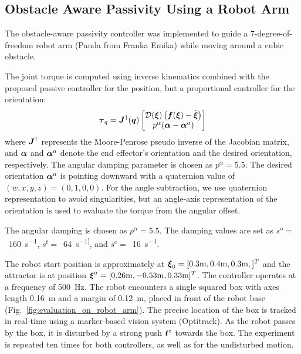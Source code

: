 \subsection{Obstacle Aware Passivity Using a Robot Arm}
The obstacle-aware passivity controller was implemented to guide a 7-degree-of-freedom robot arm (Panda from Franka Emika) while moving around a cubic obstacle. 

The joint torque is computed using inverse kinematics combined with the proposed passive controller for the position, but a proportional controller for the orientation:
\begin{equation}
	\boldsymbol{\tau}_q = \boldsymbol{J}^{\dag}(\boldsymbol{q}) 
	\begin{bmatrix} \mathcal{D}(\boldsymbol{\xi}) \left( \boldsymbol{f}(\boldsymbol{\xi}) - \dot{\boldsymbol{\xi}} \right) \\  p^\alpha (\boldsymbol{\alpha} - \boldsymbol{\alpha}^a) \end{bmatrix}
\end{equation}
where $\boldsymbol{J}^{\dag}$ represents the Moore-Penrose pseudo inverse of the Jacobian matrix, and $\boldsymbol{\alpha}$ and $\boldsymbol{\alpha}^a$ denote the end effector's orientation and the desired orientation, respectively. The angular damping parameter is chosen as $p^\alpha = 5.5$.
The desired orientation $\boldsymbol{\alpha}^a$ is pointing downward with a quaternion value of $(w, x, y, z) = (0, 1, 0, 0)$. For the angle subtraction, we use quaternion representation to avoid singularities, but an angle-axis representation of the orientation is used to evaluate the torque from the angular offset.

The angular damping is chosen as $p^\alpha = 5.5$.
The damping values are set as
$s^{\mathrm{o}}=$~\qty{160}{s^{-1}},
$s^{\mathrm{f}}=$~\qty{64}{s^{-1]}}, and
$s^{\mathrm{c}}=$~\qty{16}{s^{-1}}.

The robot start position is approximately at $\boldsymbol{\xi}_0 = [0.3\mathrm{m}, 0.4\mathrm{m}, 0.3\mathrm{m},]^T$ and the attractor is at position $\boldsymbol{\xi}^a = [0.26 \mathrm{m}, -0.53\mathrm{m}, 0.33\mathrm{m}]^T$. The controller operates at a frequency of \qty{500}{Hz}.
The robot encounters a single squared box with axes length \qty{0.16}{m} and a margin of \qty{0.12}{m}, placed in front of the robot base (Fig.~\ref{fig:evaluation_on_robot_arm}). The precise location of the box is tracked in real-time using a marker-based vision system (Optitrack). As the robot passes by the box, it is disturbed by a strong push $\boldsymbol{t}^e$ towards the box. The experiment is repeated ten times for both controllers, as well as for the undisturbed motion.

